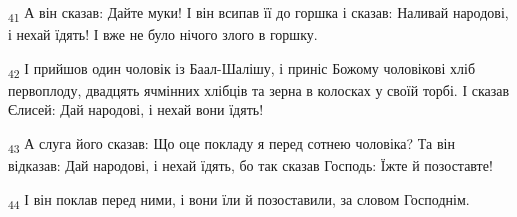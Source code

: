 \begin{tcolorbox}
\textsubscript{41} А він сказав: Дайте муки! І він всипав її до горшка і сказав: Наливай народові, і нехай їдять! І вже не було нічого злого в горшку.
\end{tcolorbox}
\begin{tcolorbox}
\textsubscript{42} І прийшов один чоловік із Баал-Шалішу, і приніс Божому чоловікові хліб первоплоду, двадцять ячмінних хлібців та зерна в колосках у своїй торбі. І сказав Єлисей: Дай народові, і нехай вони їдять!
\end{tcolorbox}
\begin{tcolorbox}
\textsubscript{43} А слуга його сказав: Що оце покладу я перед сотнею чоловіка? Та він відказав: Дай народові, і нехай їдять, бо так сказав Господь: Їжте й позоставте!
\end{tcolorbox}
\begin{tcolorbox}
\textsubscript{44} І він поклав перед ними, і вони їли й позоставили, за словом Господнім.
\end{tcolorbox}
